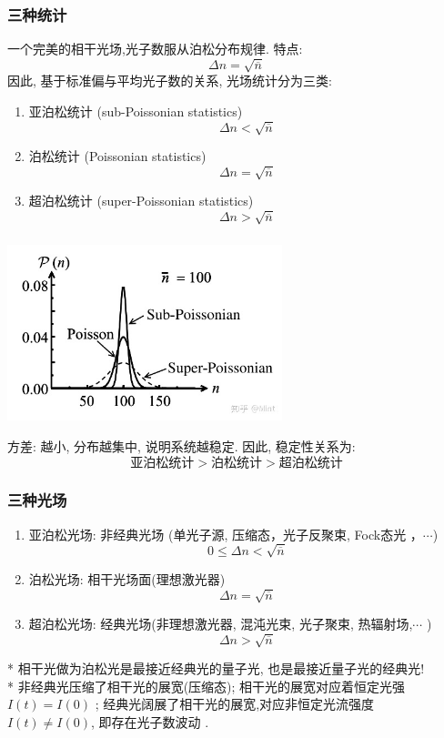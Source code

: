 \begin{frame}
 \frametitle{三种统计}
      一个完美的相干光场,光子数服从泊松分布规律. 特点:  \[ \Delta n = \sqrt{\overline{n}}    \]
      因此, 基于标准偏与平均光子数的关系, 光场统计分为三类:
      \begin{enumerate}
          \item 亚泊松统计 (sub-Poissonian statistics) 
          \[ \Delta n < \sqrt{\overline{n}}    \]
          \item 泊松统计 (Poissonian statistics)
          \[ \Delta n = \sqrt{\overline{n}}    \]
          \item 超泊松统计 (super-Poissonian statistics)
          \[ \Delta n > \sqrt{\overline{n}}    \]
      \end{enumerate}
\end{frame}

\begin{frame}
 \frametitle{}
 \begin{center}
    \includegraphics[width=0.6\textwidth]{figs/2022-05-06-10-46-42.png}
\end{center}
方差: 越小, 分布越集中, 说明系统越稳定. 因此, 稳定性关系为: \\ 
\[\text{亚泊松统计} > \text{泊松统计} > \text{超泊松统计} \]
\end{frame}

\begin{frame}
 \frametitle{三种光场}
 \begin{enumerate}
    \item 亚泊松光场: 非经典光场 (单光子源, 压缩态，光子反聚束, Fock态光 ，$\cdots$)
    \[ 0 \leq \Delta n < \sqrt{\overline{n}}    \]
    \item 泊松光场: 相干光场面(理想激光器)  
    \[ \Delta n = \sqrt{\overline{n}}    \]
    \item 超泊松光场: 经典光场(非理想激光器, 混沌光束, 光子聚束, 热辐射场,$\cdots$ )
    \[ \Delta n > \sqrt{\overline{n}}    \]
\end{enumerate}
    * 相干光做为泊松光是最接近经典光的量子光, 也是最接近量子光的经典光! \\ 
    * 非经典光压缩了相干光的展宽(压缩态); 相干光的展宽对应着恒定光强~ $I(t)=I(0)$ ; 经典光阔展了相干光的展宽,对应非恒定光流强度~ $I(t) \not = I(0)$, 即存在光子数波动 . 
\end{frame}

